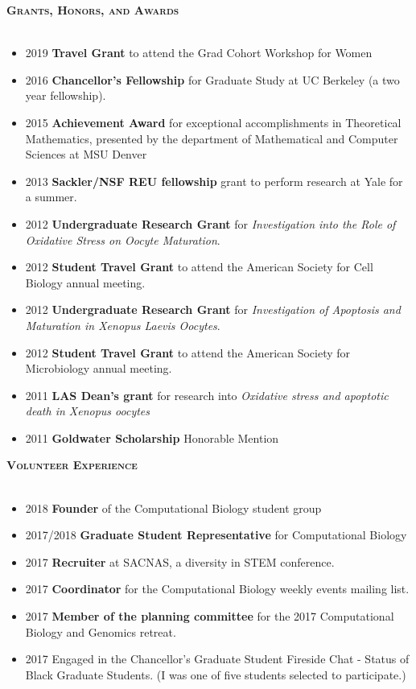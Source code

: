 \documentclass{article}
\newcommand{\lineunder}{\vspace*{-8pt} \\ \hspace*{-18pt} \hrulefill \\}
\newcommand{\header}[1]{{\vspace*{8pt}\hspace*{-16pt} \textsc{\textbf{\large{#1}}}} \vspace*{4pt} \lineunder \vspace*{4pt}}
\begin{document}

\header{Grants, Honors, and Awards}
\begin{itemize}
	\item 2019 \textbf{Travel Grant} to attend the Grad Cohort Workshop for Women
    
   \item 2016 \textbf{Chancellor's Fellowship} for Graduate Study at UC Berkeley (a two year fellowship).
   \item 2015  \textbf{Achievement Award} for exceptional accomplishments in Theoretical Mathematics, presented by the department of Mathematical and Computer Sciences at MSU Denver
   \item 2013  \textbf{Sackler/NSF REU fellowship} grant to perform research at Yale for a summer.
   \item 2012  \textbf{Undergraduate Research Grant} for \textit{Investigation into the Role of Oxidative Stress on Oocyte Maturation}.
   \item 2012 \textbf{Student Travel Grant} to attend the American Society for Cell Biology annual meeting.
   \item 2012 \textbf{Undergraduate Research Grant} for \textit{Investigation of Apoptosis and Maturation in Xenopus Laevis Oocytes}.
   \item 2012 \textbf{Student Travel Grant} to attend the American Society for Microbiology annual meeting. 
   \item 2011    \textbf{LAS Dean's grant} for research into \textit{Oxidative stress and apoptotic death in Xenopus oocytes}
   \item 2011    \textbf{Goldwater Scholarship} Honorable Mention

\end{itemize}


\header{Volunteer Experience}
\begin{itemize}
    \item 2018	\textbf{Founder} of the Computational Biology student group
    \item 2017/2018 \textbf{Graduate Student Representative} for  Computational Biology
    \item 2017 \textbf{Recruiter} at SACNAS, a diversity in STEM conference.
    \item 2017 \textbf{Coordinator} for the Computational Biology weekly events mailing list.
    \item 2017  \textbf{Member of the planning committee} for the 2017 Computational Biology and Genomics retreat.
    \item 2017 Engaged in the Chancellor's Graduate Student Fireside Chat - Status of Black Graduate Students. (I was one of five students selected to participate.)
    
\end{itemize}
\end{document}
